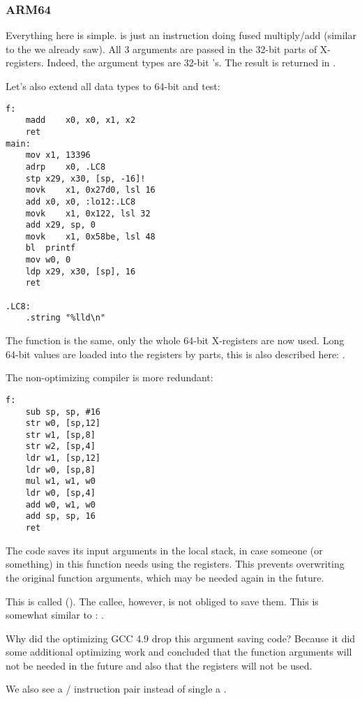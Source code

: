 \subsubsection{ARM64}


Everything here is simple.
 is just an instruction doing fused multiply/add (similar to the  we already saw).
All 3 arguments are passed in the 32-bit parts of X-registers.
Indeed, the argument types are 32-bit 's.
The result is returned in .



Let's also extend all data types to 64-bit  and test:



\begin{lstlisting}[style=customasmARM]
f:
	madd	x0, x0, x1, x2
	ret
main:
	mov	x1, 13396
	adrp	x0, .LC8
	stp	x29, x30, [sp, -16]!
	movk	x1, 0x27d0, lsl 16
	add	x0, x0, :lo12:.LC8
	movk	x1, 0x122, lsl 32
	add	x29, sp, 0
	movk	x1, 0x58be, lsl 48
	bl	printf
	mov	w0, 0
	ldp	x29, x30, [sp], 16
	ret

.LC8:
	.string	"%lld\n"
\end{lstlisting}

The \ttf{} function is the same, only the whole 64-bit X-registers are now used.
Long 64-bit values are loaded into the registers by parts, this is also described here: .


The non-optimizing compiler is more redundant:

\begin{lstlisting}[style=customasmARM]
f:
	sub	sp, sp, #16
	str	w0, [sp,12]
	str	w1, [sp,8]
	str	w2, [sp,4]
	ldr	w1, [sp,12]
	ldr	w0, [sp,8]
	mul	w1, w1, w0
	ldr	w0, [sp,4]
	add	w0, w1, w0
	add	sp, sp, 16
	ret
\end{lstlisting}

The code saves its input arguments in the local stack, 
in case someone (or something) in this function needs using the  
registers. This prevents overwriting the original
function arguments, which may be needed again in the future.

This is called  (\ARMPCS).
The callee, however, is not obliged to save them.
This is somewhat similar to : .

Why did the optimizing GCC 4.9 drop this argument saving code?
Because it did some additional optimizing work and concluded
that the function arguments will not be needed in the future 
and also that the registers  will not be used.


We also see a / instruction pair instead of single a .
